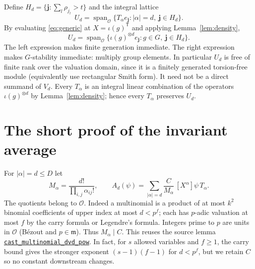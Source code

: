 \documentclass[11pt]{article}
\newcommand{\OO}{\mathcal O}
\newcommand{\fr}{\mathfrak m}
\newcommand{\Span}{\operatorname{span}}
\newcommand{\anchor}[3]{\href{https://github.com/VladimirReshetnikov/ProveIt/blob/17bf37ab3b6740d5d7430065d2f2a1a2a03e8a0e/Analysis/GeneralizedRiemannHypothesis/Lean/grh/src/#1.lean\#L#2}{\texttt{#3}}}
\begin{document}
Define $H_d=\{\mathbf j:\sum_l\rho_{j_l}>t\}$ and the integral lattice
\[
 U_d=\Span_{\OO}\{T_\alpha e_{\mathbf j}:|\alpha|=d,\ \mathbf j\in H_d\}.
\]
By evaluating \eqref{eq:generic} at $X=\iota(g)^\mathsf T$ and applying Lemma~\ref{lem:density},
\begin{equation}\label{eq:orbit}
 U_d=\Span_{\OO}\{\iota(g)^{\otimes d}e_{\mathbf j}:g\in G,\ \mathbf j\in H_d\}.
\end{equation}
The left expression makes finite generation immediate. The right expression makes $G$-stability immediate: multiply group elements. In particular $U_d$ is free of finite rank over the valuation domain, since it is a finitely generated torsion-free module (equivalently use rectangular Smith form). It need not be a direct summand of $V_d$. Every $T_\alpha$ is an integral linear combination of the operators $\iota(g)^{\otimes d}$ by Lemma~\ref{lem:density}; hence every $T_\alpha$ preserves $U_d$.

\section{The short proof of the invariant average}
For $|\alpha|=d\le D$ let
\[
 M_\alpha=\frac{d!}{\prod_{i,j}\alpha_{ij}!},\qquad
 A_d(\psi)=\sum_{|\alpha|=d}\frac{C}{M_\alpha}\,[X^\alpha]\psi\,T_\alpha.
\]
The quotients belong to $\OO$. Indeed a multinomial is a product of at most $k^2$ binomial coefficients of upper index at most $d<p^f$; each has $p$-adic valuation at most $f$ by the carry formula or Legendre's formula. Integers prime to $p$ are units in $\OO$ (B\'ezout and $p\in\fr$). Thus $M_\alpha\mid C$. This reuses the source lemma \anchor{New/UpperBound/ElementaryDivisors/InvariantAverage}{81}{cast\_multinomial\_dvd\_pow}. In fact, for $s$ allowed variables and $f\ge1$, the carry bound gives the stronger exponent $(s-1)(f-1)$ for $d<p^f$, but we retain $C$ so no constant downstream changes.
\end{document}
